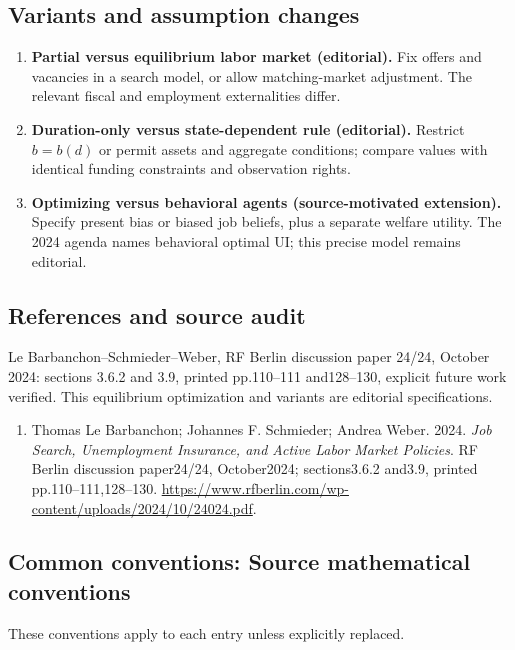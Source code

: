 \documentclass[11pt,a4paper]{article}
\begin{document}
\subsection*{Variants and assumption changes}
\begin{enumerate}
\item \textbf{Partial versus equilibrium labor market (editorial).} Fix offers and vacancies in a search model, or allow matching-market adjustment. The relevant fiscal and employment externalities differ.
\item \textbf{Duration-only versus state-dependent rule (editorial).} Restrict \(b=b(d)\) or permit assets and aggregate conditions; compare values with identical funding constraints and observation rights.
\item \textbf{Optimizing versus behavioral agents (source-motivated extension).} Specify present bias or biased job beliefs, plus a separate welfare utility. The 2024 agenda names behavioral optimal UI; this precise model remains editorial.
\end{enumerate}
\subsection*{References and source audit}
Le Barbanchon--Schmieder--Weber, RF Berlin discussion paper 24/24, October 2024: sections 3.6.2 and 3.9, printed pp.110--111 and128--130, explicit future work verified. This equilibrium optimization and variants are editorial specifications.
\begin{enumerate}\raggedright
\item\hypertarget{definitions:source:30007760:1}{} Thomas Le Barbanchon; Johannes F. Schmieder; Andrea Weber. 2024. \emph{Job Search, Unemployment Insurance, and Active Labor Market Policies}. RF Berlin discussion paper24/24, October2024; sections3.6.2 and3.9, printed pp.110–111,128–130.
\url{https://www.rfberlin.com/wp-content/uploads/2024/10/24024.pdf}.
\end{enumerate}

\subsection*{Common conventions: Source mathematical conventions}

These conventions apply to each entry unless explicitly replaced.
\end{document}
